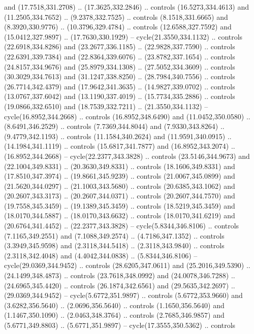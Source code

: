 \begin{scope}[cm={{1.25,0.0,0.0,-1.25,(0.0,743.43331)}}]
    and (17.7518,331.2708) .. (17.3625,332.2846) .. controls (16.5273,334.4613)
    and (11.2505,334.7652) .. (9.2378,332.7525) .. controls (8.1518,331.6665) and
    (8.3920,330.9776) .. (10.3796,329.4784) .. controls (12.6588,327.7592) and
    (15.0412,327.9897) .. (17.7630,330.1929) -- cycle(21.3550,334.1132) ..
    controls (22.6918,334.8286) and (23.2677,336.1185) .. (22.9828,337.7590) ..
    controls (22.6391,339.7384) and (22.8364,339.6076) .. (23.8782,337.1654) ..
    controls (24.8157,334.9676) and (25.8979,334.1308) .. (27.5052,334.3609) ..
    controls (30.3029,334.7613) and (31.1247,338.8250) .. (28.7984,340.7556) ..
    controls (26.7714,342.4379) and (17.9642,341.3635) .. (14.9827,339.0702) ..
    controls (13.0767,337.6042) and (13.1190,337.4019) .. (15.7734,335.2886) ..
    controls (19.0866,332.6510) and (18.7539,332.7211) .. (21.3550,334.1132) --
    cycle(16.8952,344.2668) .. controls (16.8952,348.6490) and (11.0452,350.0580)
    .. (8.6491,346.2529) .. controls (7.7369,344.8044) and (7.9330,343.8264) ..
    (9.4779,342.1193) .. controls (11.1584,340.2624) and (11.9591,340.0915) ..
    (14.1984,341.1119) .. controls (15.6817,341.7877) and (16.8952,343.2074) ..
    (16.8952,344.2668) -- cycle(22.2377,343.3828) .. controls (23.5146,344.9673)
    and (22.1004,349.8331) .. (20.3630,349.8331) .. controls (18.1606,349.8331)
    and (17.8510,347.3974) .. (19.8661,345.9239) .. controls (21.0067,345.0899)
    and (21.5620,344.0297) .. (21.1003,343.5680) .. controls (20.6385,343.1062)
    and (20.2607,343.3173) .. (20.2607,344.0371) .. controls (20.2607,344.7570)
    and (19.7558,345.3459) .. (19.1389,345.3459) .. controls (18.5219,345.3459)
    and (18.0170,344.5887) .. (18.0170,343.6632) .. controls (18.0170,341.6219)
    and (20.6764,341.4452) .. (22.2377,343.3828) -- cycle(5.8344,346.8106) ..
    controls (7.1165,349.2551) and (7.1088,349.2574) .. (4.7186,347.1352) ..
    controls (3.3949,345.9598) and (2.3118,344.5418) .. (2.3118,343.9840) ..
    controls (2.3118,342.4048) and (4.4042,344.0838) .. (5.8344,346.8106) --
    cycle(29.0369,344.9452) .. controls (28.6205,347.0611) and (25.2016,349.5390)
    .. (24.1499,348.4873) .. controls (23.7618,348.0992) and (24.0078,346.7288) ..
    (24.6965,345.4420) .. controls (26.1874,342.6561) and (29.5635,342.2697) ..
    (29.0369,344.9452) -- cycle(5.6772,351.9897) .. controls (5.6772,353.9660) and
    (3.6282,356.5640) .. (2.0696,356.5640) .. controls (1.1650,356.5640) and
    (1.1467,350.1090) .. (2.0463,348.3764) .. controls (2.7685,346.9857) and
    (5.6771,349.8803) .. (5.6771,351.9897) -- cycle(17.3555,350.5362) .. controls

\end{scope}
